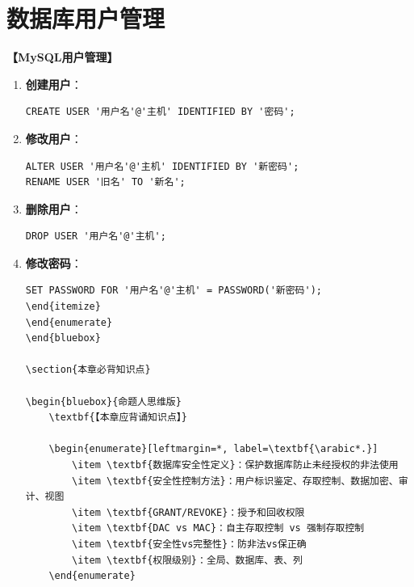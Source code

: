 \documentclass[12pt, a4paper]{article}
\newenvironment{bluebox}[1]{%
  \begin{trivlist}
  \item[\hskip\labelsep \textbf{#1}]
  \setlength{\parskip}{0.5ex}
  \setlength{\itemsep}{0.5ex}
}{%
  \end{trivlist}
}
\begin{document}
\section{数据库用户管理}

\begin{bluebox}{用户管理}
\textbf{【MySQL用户管理】}

\begin{enumerate}[leftmargin=*, label=\textbf{\arabic*.}]
\item \textbf{创建用户}：
\begin{verbatim}
CREATE USER '用户名'@'主机' IDENTIFIED BY '密码';
		      \end{verbatim}
\item \textbf{修改用户}：
\begin{verbatim}
ALTER USER '用户名'@'主机' IDENTIFIED BY '新密码';
RENAME USER '旧名' TO '新名';
		      \end{verbatim}
\item \textbf{删除用户}：
\begin{verbatim}
DROP USER '用户名'@'主机';
		      \end{verbatim}
\item \textbf{修改密码}：
\begin{verbatim}
SET PASSWORD FOR '用户名'@'主机' = PASSWORD('新密码');
\end{itemize}
\end{enumerate}
\end{bluebox}

\section{本章必背知识点}

\begin{bluebox}{命题人思维版}
	\textbf{【本章应背诵知识点】}

	\begin{enumerate}[leftmargin=*, label=\textbf{\arabic*.}]
		\item \textbf{数据库安全性定义}：保护数据库防止未经授权的非法使用
		\item \textbf{安全性控制方法}：用户标识鉴定、存取控制、数据加密、审计、视图
		\item \textbf{GRANT/REVOKE}：授予和回收权限
		\item \textbf{DAC vs MAC}：自主存取控制 vs 强制存取控制
		\item \textbf{安全性vs完整性}：防非法vs保正确
		\item \textbf{权限级别}：全局、数据库、表、列
	\end{enumerate}


\end{verbatim}
\end{enumerate}
\end{bluebox}
\end{document}
